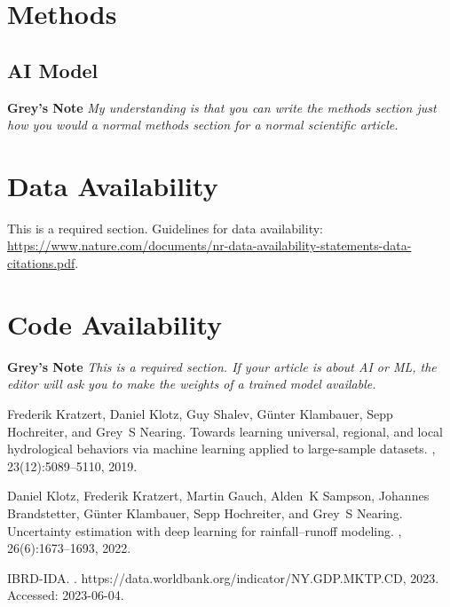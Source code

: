 \documentclass[pdflatex]{sn-jnl}
\begin{document}
\newpage
\unnumbered

\unnumbered
\section{Methods}
\subsection{AI Model}
\textbf{Grey's Note} \textit{My understanding is that you can write the methods section just how you would a normal methods section for a normal scientific article.}


\section*{Data Availability}
This is a required section. Guidelines for data availability: \url{https://www.nature.com/documents/nr-data-availability-statements-data-citations.pdf}.

\section*{Code Availability}
\textbf{Grey's Note} \textit{This is a required section. If your article is about AI or ML, the editor will ask you to make the weights of a trained model available.}


\newpage
\renewcommand\refname{Methods References}
\begin{thebibliography}{10}

Frederik Kratzert, Daniel Klotz, Guy Shalev, G{\"u}nter Klambauer, Sepp
  Hochreiter, and Grey~S Nearing.
\newblock Towards learning universal, regional, and local hydrological
  behaviors via machine learning applied to large-sample datasets.
, 23(12):5089--5110, 2019.

Daniel Klotz, Frederik Kratzert, Martin Gauch, Alden~K Sampson, Johannes
  Brandstetter, G{\"u}nter Klambauer, Sepp Hochreiter, and Grey~S Nearing.
\newblock Uncertainty estimation with deep learning for rainfall--runoff
  modeling.
, 26(6):1673--1693, 2022.

IBRD-IDA.
.
\newblock https://data.worldbank.org/indicator/NY.GDP.MKTP.CD, 2023.
\newblock Accessed: 2023-06-04.

\end{thebibliography}
\end{document}
